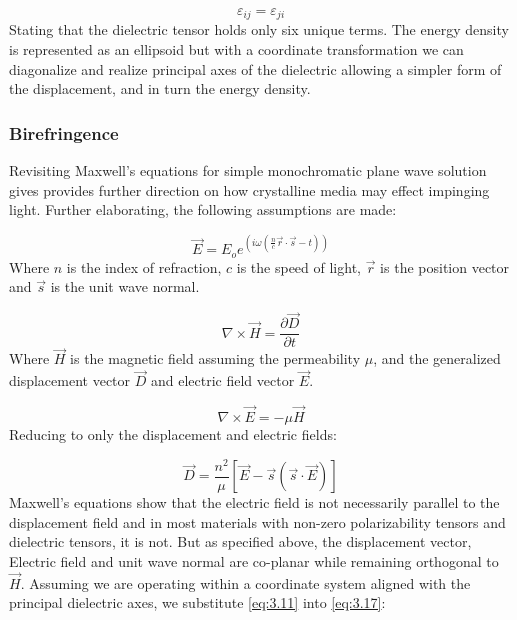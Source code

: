 \begin{equation}
\varepsilon_{ij} = \varepsilon_{ji}
\end{equation}
Stating that the dielectric tensor holds only six unique terms. The energy density is represented as an ellipsoid but with a coordinate transformation we can diagonalize and realize principal axes of the dielectric allowing a simpler form of the displacement, and in turn the energy density.

\subsubsection{Birefringence}
Revisiting Maxwell's equations for simple monochromatic plane wave solution gives provides further direction on how crystalline media may effect impinging light. Further elaborating, the following assumptions are made:

\begin{equation}
\vec{E} = E_o e^{(i \omega (\frac{n}{c} \vec{r}\cdot \vec{s}-t))}
\end{equation}
Where $n$ is the index of refraction, $c$ is the speed of light, $\vec{r}$ is the position vector and $\vec{s}$ is the unit wave normal.

\begin{equation}
\nabla \times \vec{H}= \frac{\partial \vec{D}}{\partial t}
\end{equation}
Where $\vec{H}$ is the magnetic field assuming the permeability $\mu$, and the generalized displacement vector $\vec{D}$ and electric field vector $\vec{E}$.

\begin{equation}
\nabla \times \vec{E} = -\mu \vec{H}
\end{equation}
Reducing to only the displacement and electric fields:

\begin{equation}\label{eq:3.17}
\vec{D} = \frac{n^2}{\mu}[\vec{E}-\vec{s}(\vec{s}\cdot \vec{E})]
\end{equation}
Maxwell's equations show that the electric field is not necessarily parallel to the displacement field and in most materials with non-zero polarizability tensors and dielectric tensors, it is not. But as specified above, the displacement vector, Electric field and unit wave normal are co-planar while remaining orthogonal to $\vec{H}$. Assuming we are operating within a coordinate system aligned with the principal dielectric axes, we substitute \ref{eq:3.11} into \ref{eq:3.17}:

